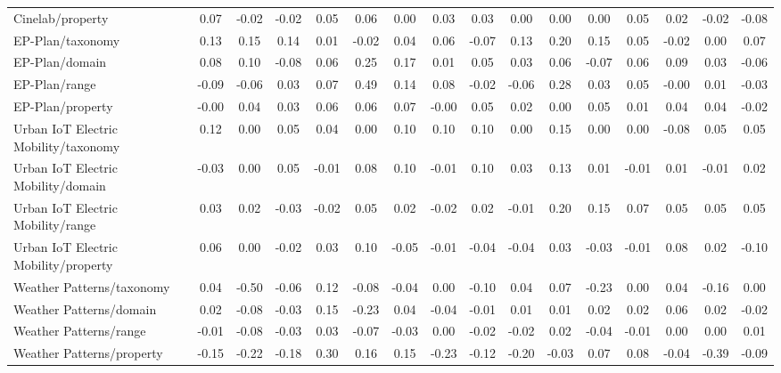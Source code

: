 \begin{tabular}{lccccccccccccccc}
Cinelab/property & 0.07 & -0.02 & -0.02 & 0.05 & 0.06 & 0.00 & 0.03 & 0.03 & 0.00 & 0.00 & 0.00 & 0.05 & 0.02 & -0.02 & -0.08 \\
EP-Plan/taxonomy & 0.13 & 0.15 & 0.14 & 0.01 & -0.02 & 0.04 & 0.06 & -0.07 & 0.13 & 0.20 & 0.15 & 0.05 & -0.02 & 0.00 & 0.07 \\
EP-Plan/domain & 0.08 & 0.10 & -0.08 & 0.06 & 0.25 & 0.17 & 0.01 & 0.05 & 0.03 & 0.06 & -0.07 & 0.06 & 0.09 & 0.03 & -0.06 \\
EP-Plan/range & -0.09 & -0.06 & 0.03 & 0.07 & 0.49 & 0.14 & 0.08 & -0.02 & -0.06 & 0.28 & 0.03 & 0.05 & -0.00 & 0.01 & -0.03 \\
EP-Plan/property & -0.00 & 0.04 & 0.03 & 0.06 & 0.06 & 0.07 & -0.00 & 0.05 & 0.02 & 0.00 & 0.05 & 0.01 & 0.04 & 0.04 & -0.02 \\
Urban IoT Electric Mobility/taxonomy & 0.12 & 0.00 & 0.05 & 0.04 & 0.00 & 0.10 & 0.10 & 0.10 & 0.00 & 0.15 & 0.00 & 0.00 & -0.08 & 0.05 & 0.05 \\
Urban IoT Electric Mobility/domain & -0.03 & 0.00 & 0.05 & -0.01 & 0.08 & 0.10 & -0.01 & 0.10 & 0.03 & 0.13 & 0.01 & -0.01 & 0.01 & -0.01 & 0.02 \\
Urban IoT Electric Mobility/range & 0.03 & 0.02 & -0.03 & -0.02 & 0.05 & 0.02 & -0.02 & 0.02 & -0.01 & 0.20 & 0.15 & 0.07 & 0.05 & 0.05 & 0.05 \\
Urban IoT Electric Mobility/property & 0.06 & 0.00 & -0.02 & 0.03 & 0.10 & -0.05 & -0.01 & -0.04 & -0.04 & 0.03 & -0.03 & -0.01 & 0.08 & 0.02 & -0.10 \\
Weather Patterns/taxonomy & 0.04 & -0.50 & -0.06 & 0.12 & -0.08 & -0.04 & 0.00 & -0.10 & 0.04 & 0.07 & -0.23 & 0.00 & 0.04 & -0.16 & 0.00 \\
Weather Patterns/domain & 0.02 & -0.08 & -0.03 & 0.15 & -0.23 & 0.04 & -0.04 & -0.01 & 0.01 & 0.01 & 0.02 & 0.02 & 0.06 & 0.02 & -0.02 \\
Weather Patterns/range & -0.01 & -0.08 & -0.03 & 0.03 & -0.07 & -0.03 & 0.00 & -0.02 & -0.02 & 0.02 & -0.04 & -0.01 & 0.00 & 0.00 & 0.01 \\
Weather Patterns/property & -0.15 & -0.22 & -0.18 & 0.30 & 0.16 & 0.15 & -0.23 & -0.12 & -0.20 & -0.03 & 0.07 & 0.08 & -0.04 & -0.39 & -0.09 \\
\bottomrule
\end{tabular}
